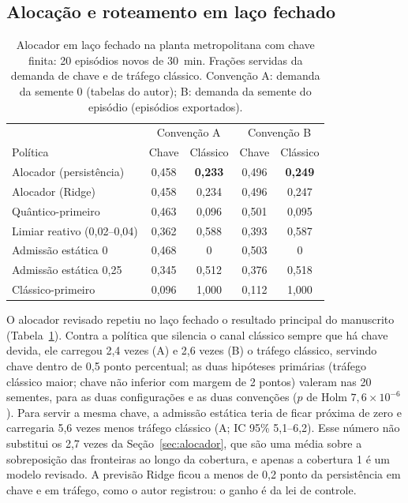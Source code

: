\documentclass[12pt]{article}
\begin{document}
\subsection{Alocação e roteamento em laço fechado}
\label{sec:aloc_rot_lf}

\begin{table}[ht]
\centering
\caption{Alocador em laço fechado na planta metropolitana com chave finita: 20
episódios novos de 30~min. Frações servidas da demanda de chave e de tráfego
clássico. Convenção A: demanda da semente 0 (tabelas do autor); B: demanda da
semente do episódio (episódios exportados).}
\label{tab:aloc_lf}
\small
\begin{tabular}{lcccc}
\toprule
 & \multicolumn{2}{c}{Convenção A} & \multicolumn{2}{c}{Convenção B} \\
Política & Chave & Clássico & Chave & Clássico \\
\midrule
Alocador (persistência) & 0,458 & \textbf{0,233} & 0,496 & \textbf{0,249} \\
Alocador (Ridge) & 0,458 & 0,234 & 0,496 & 0,247 \\
Quântico-primeiro & 0,463 & 0,096 & 0,501 & 0,095 \\
Limiar reativo (0,02--0,04) & 0,362 & 0,588 & 0,393 & 0,587 \\
Admissão estática 0 & 0,468 & 0 & 0,503 & 0 \\
Admissão estática 0,25 & 0,345 & 0,512 & 0,376 & 0,518 \\
Clássico-primeiro & 0,096 & 1,000 & 0,112 & 1,000 \\
\bottomrule
\end{tabular}
\end{table}

O alocador revisado repetiu no laço fechado o resultado principal do manuscrito
(Tabela~\ref{tab:aloc_lf}). Contra a política que silencia o canal clássico
sempre que há chave devida, ele carregou 2,4 vezes (A) e 2,6 vezes (B) o tráfego
clássico, servindo chave dentro de 0,5 ponto percentual; as duas hipóteses
primárias (tráfego clássico maior; chave não inferior com margem de 2 pontos)
valeram nas 20 sementes, para as duas configurações e as duas convenções ($p$ de
Holm $7{,}6\times10^{-6}$). Para servir a mesma chave, a admissão estática teria
de ficar próxima de zero e carregaria 5,6 vezes menos tráfego clássico (A; IC
95\% 5,1--6,2). Esse número não substitui os 2,7 vezes da
Seção~\ref{sec:alocador}, que são uma média sobre a sobreposição das fronteiras
ao longo da cobertura, e apenas a cobertura 1 é um modelo revisado. A previsão
Ridge ficou a menos de 0,2 ponto da persistência em chave e em tráfego, como o
autor registrou: o ganho é da lei de controle.
\end{document}
